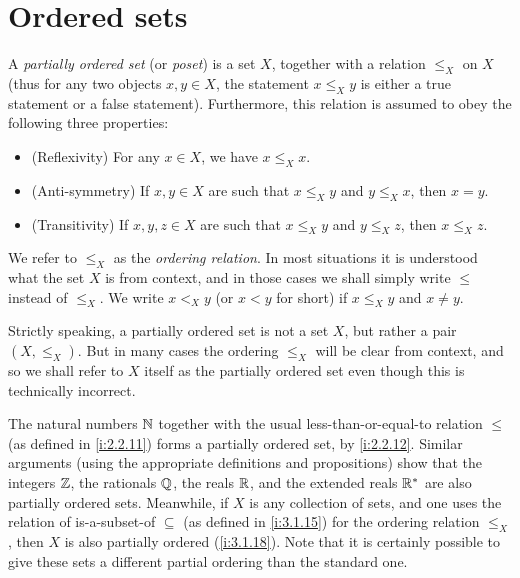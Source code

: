 \section{Ordered sets}\label{i:sec:8.5}

\begin{defn}\label{i:8.5.1}
  A \emph{partially ordered set} (or \emph{poset}) is a set \(X\), together with a relation \(\leq_X\) on \(X\)
  (thus for any two objects \(x, y \in X\), the statement \(x \leq_X y\) is either a true statement or a false statement).
  Furthermore, this relation is assumed to obey the following three properties:
  \begin{itemize}
    \item (Reflexivity) For any \(x \in X\), we have \(x \leq_X x\).
    \item (Anti-symmetry) If \(x, y \in X\) are such that \(x \leq_X y\) and \(y \leq_X x\), then \(x = y\).
    \item (Transitivity) If \(x, y, z \in X\) are such that \(x \leq_X y\) and \(y \leq_X z\), then \(x \leq_X z\).
  \end{itemize}
  We refer to \(\leq_X\) as the \emph{ordering relation}.
  In most situations it is understood what the set \(X\) is from context, and in those cases we shall simply write \(\leq\) instead of \(\leq_X\).
  We write \(x <_X y\) (or \(x < y\) for short) if \(x \leq_X y\) and \(x \neq y\).
\end{defn}

\begin{note}
  Strictly speaking, a partially ordered set is not a set \(X\), but rather a pair \((X, \leq_X)\).
  But in many cases the ordering \(\leq_X\) will be clear from context, and so we shall refer to \(X\) itself as the partially ordered set even though this is technically incorrect.
\end{note}

\begin{eg}\label{i:8.5.2}
  The natural numbers \(\mathbb{N}\) together with the usual less-than-or-equal-to relation \(\leq\) (as defined in \cref{i:2.2.11}) forms a partially ordered set, by \cref{i:2.2.12}.
  Similar arguments (using the appropriate definitions and propositions) show that the integers \(\mathbb{Z}\), the rationals \(\mathbb{Q}\), the reals \(\mathbb{R}\), and the extended reals \(\mathbb{R}^*\) are also partially ordered sets.
  Meanwhile, if \(X\) is any collection of sets, and one uses the relation of is-a-subset-of \(\subseteq\) (as defined in \cref{i:3.1.15}) for the ordering relation \(\leq_X\), then \(X\) is also partially ordered (\cref{i:3.1.18}).
  Note that it is certainly possible to give these sets a different partial ordering than the standard one.
\end{eg}

